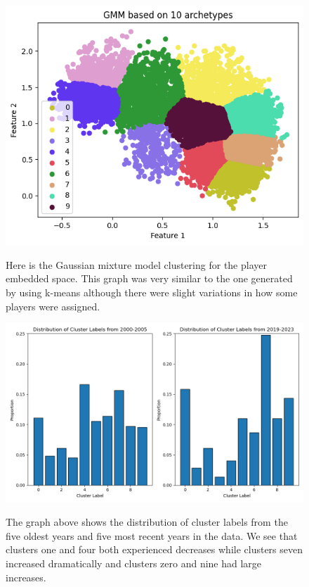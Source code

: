 \documentclass[12pt, letterpaper, titlepage]{article}
\begin{document}
\begin{figure}
  \vspace{1em}
  \begin{minipage}[b]{0.35\textwidth}
    \includegraphics[width=\linewidth]{GaussianMM}
    \label{fig:GaussianMM}
  \end{minipage}
  \hfill
  \begin{minipage}[b]{0.5\textwidth}
    Here is the Gaussian mixture model clustering for the player embedded space.  This graph was very similar to the one generated by using k-means although there were slight variations in how some players were assigned.   
  \end{minipage}


  \vspace{1em}
  \begin{minipage}[b]{0.4\textwidth}
    \includegraphics[width=\linewidth]{ClusterCountsByYear}
    \label{ClusterCountsByYear}
  \end{minipage}
  \hfill
  \begin{minipage}[b]{0.5\textwidth}
    The graph above shows the distribution of cluster labels from the five oldest years and five most recent years in the data.  We see that clusters one and four both experienced decreases while clusters seven increased dramatically and clusters zero and nine had large increases.
  \end{minipage}

\end{figure}
\end{document}
